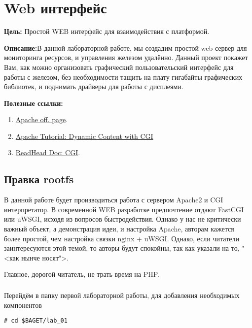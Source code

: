 \chapter{Web интерфейс}
\textbf{Цель:} Простой WEB интерфейс для взаимодействия с платформой.

\vspace{5mm}
\textbf{Описание:}В данной лабораторной работе, мы создадим простой web сервер для мониторинга ресурсов, и управления железом удалённо. Данный проект покажет Вам, как можно организовать графический пользовательский интерфейс для работы с железом, без необходимости тащить на плату гигабайты графических библиотек, и поднимать драйверы для работы с дисплеями.  

\vspace{5mm}
\textbf{Полезные ссылки:}
\begin{enumerate}
	\item \href{https://httpd.apache.org/}{Apache off. page}.
	\item \href{https://httpd.apache.org/docs/2.4/howto/cgi.html}{Apache Tutorial: Dynamic Content with CGI}
	\item \href{https://lectureswww.readthedocs.io/5.web.server/cgi.html}{ReadHead Doc: CGI}.

\end{enumerate}

\section{Правка rootfs}

В данной работе будет производиться работа с сервером Apache2 и CGI интерпретатор. В современной WEB разработке предпочтение отдают FastCGI или uWSGI, исходя из вопросов быстродействия. Однако у нас не критически важный объект, а демонстрация идеи, и настройка Apache, авторам кажется более простой, чем настройка связки nginx + uWSGI. Однако, если читатели заинтересуются этой темой, то авторы будут спокойны, так как указали на то, "<как нынче носят">. 

Главное, дорогой читатель, не трать время на PHP.    

\subsection{}Перейдём в папку первой лабораторной работы, для добавления необходимых компонентов
\begin{lstlisting}[style=bash]
# cd $BAGET/lab_01
\end{lstlisting}


